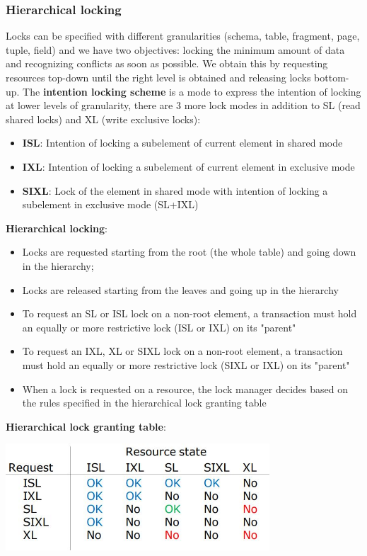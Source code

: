 \subsubsection{Hierarchical locking}
Locks can be specified with different granularities (schema, table, fragment, page, tuple, field) and we have two objectives: locking the minimum amount of data and recognizing conflicts as soon as possible. We obtain this by requesting resources top-down until the right level is obtained and releasing locks bottom-up.\newline
\newline
The \textbf{intention locking scheme} is a mode to express the intention of locking at lower levels of granularity, there are 3 more lock modes in addition to SL (read shared locks) and XL (write exclusive locks):
\begin{itemize}
    \item \textbf{ISL}: Intention of locking a subelement of current element
    in shared mode
    \item \textbf{IXL}: Intention of locking a subelement of current
    element in exclusive mode
    \item \textbf{SIXL}: Lock of the element in shared mode with intention
    of locking a subelement in exclusive mode (SL+IXL)    
\end{itemize}
\textbf{Hierarchical locking}:
\begin{itemize}
    \item Locks are requested starting from the root (the whole table) and going down in the hierarchy;
    \item Locks are released starting from the leaves and going up
    in the hierarchy
    \item To request an SL or ISL lock on a non-root element, a
    transaction must hold an equally or more restrictive lock
    (ISL or IXL) on its "parent"
    \item  To request an IXL, XL or SIXL lock on a non-root element,
    a transaction must hold an equally or more restrictive lock
    (SIXL or IXL) on its "parent"
    \item When a lock is requested on a resource, the lock manager
    decides based on the rules specified in the hierarchical
    lock granting table 
\end{itemize}
\textbf{Hierarchical lock granting table}:
\begin{center}
    \includegraphics[height=4cm]{../arguments/hierarchicallockgrantingtable.JPG}
\end{center}
